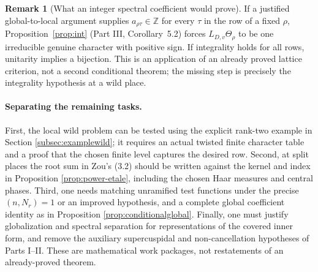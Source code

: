 \documentclass[11pt]{article}
\theoremstyle{plain}
\theoremstyle{definition}
\newtheorem{remark}[theorem]{Remark}
\begin{document}
\begin{remark}[What an integer spectral coefficient would prove]
If a justified global-to-local argument supplies
$a_{\rho\tau}\in\mathbb Z$ for every $\tau$ in the row of a fixed
$\rho$, Proposition~\ref{prop:int} (Part III, Corollary~5.2)
forces $L_{D,v}\Theta_\rho$ to be one irreducible genuine
character with positive sign.  If integrality holds for all
rows, unitarity implies a bijection.  This is an application of
an already proved lattice criterion, not a second conditional
theorem; the missing step is precisely the integrality
hypothesis at a wild place.
\end{remark}

\paragraph{Separating the remaining tasks.}
First, the local wild problem can be tested using the explicit
rank-two example in Section \ref{subsec:examplewild}; it requires
an actual twisted finite character table and a proof that the
chosen finite level captures the desired row.  Second, at split
places the root sum in Zou's (3.2) should be written against the
kernel and index in Proposition \ref{prop:power-etale}, including
the chosen Haar measures and central phases.  Third, one needs
matching unramified test functions under the precise
$(n,N_r)=1$ or an improved hypothesis, and a complete global
coefficient identity as in Proposition \ref{prop:conditionalglobal}.
Finally, one must justify globalization and spectral separation
for representations of the covered inner form, and remove the
auxiliary supercuspidal and non-cancellation hypotheses of Parts
I--II.  These are mathematical work packages, not restatements of
an already-proved theorem.
\end{document}
